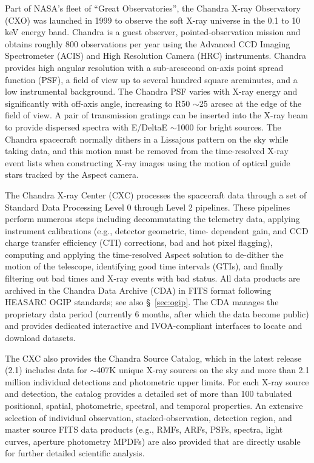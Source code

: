 \documentclass[11pt,a4paper]{ivoa}
\begin{document}
Part of NASA's fleet of ``Great Observatories'', the Chandra X-ray Observatory (CXO) was launched in 1999 to observe
the soft X-ray universe in the 0.1 to 10 keV energy band. Chandra is a guest observer, pointed-observation mission and
obtains roughly 800 observations per year using the Advanced CCD Imaging Spectrometer (ACIS) and High Resolution Camera
(HRC) instruments. Chandra provides high angular resolution with a sub-arcsecond on-axis point spread function (PSF),
a field of view up to several hundred square arcminutes, and a low instrumental background. The Chandra PSF varies with
X-ray energy and significantly with off-axis angle, increasing to R50 $\sim$25 arcsec at the edge of the field of view.
A pair of transmission gratings can be inserted into the X-ray beam to provide dispersed spectra with E/DeltaE $\sim$1000
for bright sources. The Chandra spacecraft normally dithers in a Lissajous pattern on the sky while taking data, and
this motion must be removed from the time-resolved X-ray event lists when constructing X-ray images using the motion
of optical guide stars tracked by the Aspect camera.

The Chandra X-ray Center (CXC) processes the spacecraft data through a set of Standard Data Processing Level 0 through
Level 2 pipelines. These pipelines perform numerous steps including decommutating the telemetry data,
applying instrument calibrations (e.g., detector geometric, time- dependent gain, and CCD charge transfer efficiency
(CTI) corrections, bad and hot pixel flagging), computing and applying the time-resolved Aspect solution to de-dither
the motion of the telescope, identifying good time intervals (GTIs), and finally filtering out bad times and X-ray events
with bad status. All data products are archived in the Chandra Data Archive (CDA) in FITS format following HEASARC
OGIP standards;  see also \S~\ref{sec:ogip}. The CDA manages the proprietary data period (currently 6 months, after
which the data become public) and provides dedicated interactive and IVOA-compliant interfaces to locate and download
datasets.

The CXC also provides the Chandra Source Catalog, which in the latest release (2.1) includes data for $\sim$407K unique
X-ray sources on the sky and more than 2.1 million individual detections and photometric upper limits. For each X-ray
source and detection, the catalog provides a detailed set of more than 100 tabulated positional, spatial, photometric,
spectral, and temporal properties. An extensive selection of individual observation, stacked-observation, detection
region, and master source FITS data products (e.g., RMFs, ARFs, PSFs, spectra, light curves, aperture photometry MPDFs)
are also provided that are directly usable for further detailed scientific analysis.
\end{document}
